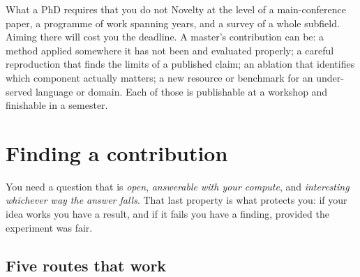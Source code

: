 \documentclass[11pt,a4paper]{article}
\begin{document}
\begin{wbox}{What a PhD requires that you do not}
Novelty at the level of a main-conference paper, a programme of work spanning
years, and a survey of a whole subfield. Aiming there will cost you the
deadline. A master's contribution can be: a method applied somewhere it has
not been and evaluated properly; a careful reproduction that finds the limits
of a published claim; an ablation that identifies which component actually
matters; a new resource or benchmark for an under-served language or domain.
Each of those is publishable at a workshop and finishable in a semester.
\end{wbox}

\section{Finding a contribution}
\label{sec:contribution}

You need a question that is \emph{open}, \emph{answerable with your compute},
and \emph{interesting whichever way the answer falls}. That last property is
what protects you: if your idea works you have a result, and if it fails you
have a finding, provided the experiment was fair.

\subsection{Five routes that work}
\end{document}
